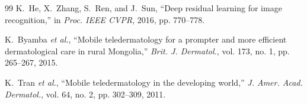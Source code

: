 \documentclass[10pt,conference]{IEEEtran}
\begin{document}
\begin{thebibliography}{99}
K.~He, X.~Zhang, S.~Ren, and J.~Sun, ``Deep residual learning for image recognition,'' in \emph{Proc. IEEE CVPR}, 2016, pp. 770--778.

K.~Byamba \emph{et al.}, ``Mobile teledermatology for a prompter and more efficient dermatological care in rural Mongolia,'' \emph{Brit. J. Dermatol.}, vol. 173, no. 1, pp. 265--267, 2015.

K.~Tran \emph{et al.}, ``Mobile teledermatology in the developing world,'' \emph{J. Amer. Acad. Dermatol.}, vol. 64, no. 2, pp. 302--309, 2011.
\end{thebibliography}
\end{document}

